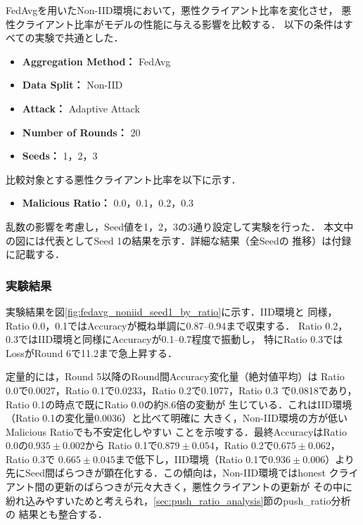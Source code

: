 \documentclass[a4j, twocolumn, dvipdfmx]{jsarticle}  %
\begin{document}
FedAvgを用いたNon-IID環境において，悪性クライアント比率を変化させ，
悪性クライアント比率がモデルの性能に与える影響を比較する．
以下の条件はすべての実験で共通とした．

\begin{itemize}
    \item \textbf{Aggregation Method：} FedAvg
    \item \textbf{Data Split：} Non-IID
    \item \textbf{Attack：} Adaptive Attack
    \item \textbf{Number of Rounds：} 20
    \item \textbf{Seeds：} 1，2，3
\end{itemize}

比較対象とする悪性クライアント比率を以下に示す．

\begin{itemize}
    \item \textbf{Malicious Ratio：} 0.0，0.1，0.2，0.3
\end{itemize}

乱数の影響を考慮し，Seed値を1，2，3の3通り設定して実験を行った．
本文中の図には代表としてSeed 1の結果を示す．詳細な結果（全Seedの
推移）は付録に記載する．

\subsubsection{実験結果}

実験結果を図\ref{fig:fedavg_noniid_seed1_by_ratio}に示す．IID環境と
同様，Ratio 0.0，0.1ではAccuracyが概ね単調に0.87--0.94まで収束する．
Ratio 0.2，0.3ではIID環境と同様にAccuracyが0.1--0.7程度で振動し，
特にRatio 0.3ではLossがRound 6で11.2まで急上昇する．

定量的には，Round 5以降のRound間Accuracy変化量（絶対値平均）は
Ratio 0.0で0.0027，Ratio 0.1で0.0233，Ratio 0.2で0.1077，Ratio 0.3
で0.0818であり，Ratio 0.1の時点で既にRatio 0.0の約8.6倍の変動が
生じている．これはIID環境（Ratio 0.1の変化量0.0036）と比べて明確に
大きく，Non-IID環境の方が低いMalicious Ratioでも不安定化しやすい
ことを示唆する．最終AccuracyはRatio 0.0の$0.935\pm0.002$から
Ratio 0.1で$0.879\pm0.054$，Ratio 0.2で$0.675\pm0.062$，Ratio 0.3で
$0.665\pm0.045$まで低下し，IID環境（Ratio 0.1で$0.936\pm0.006$）より
先にSeed間ばらつきが顕在化する．この傾向は，Non-IID環境ではhonest
クライアント間の更新のばらつきが元々大きく，悪性クライアントの更新が
その中に紛れ込みやすいためと考えられ，\ref{sec:push_ratio_analysis}節のpush\_ratio分析の
結果とも整合する．
\end{document}
